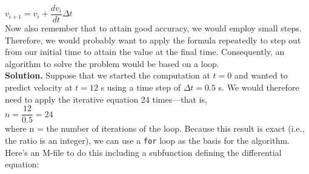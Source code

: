 \documentclass[../main.tex]{subfiles}
\begin{document}
$v_{i+1} = v_i + \dfrac{dv_i}{dt}\Delta t$\\

\noindent Now also remember that to attain good accuracy, we would employ small steps. Therefore,
we would probably want to apply the formula repeatedly to step out from our initial time
to attain the value at the final time. Consequently, an algorithm to solve the problem would
be based on a loop.\\

\noindent\textbf{Solution.} Suppose that we started the computation at $t = 0$ and wanted to predict
velocity at $t = 12$ s using a time step of $\Delta t = 0.5$ s. We would therefore need to apply the
iterative equation 24 times---that is,\\

$n = \dfrac{12}{0.5} = 24$\\

\noindent
where n = the number of iterations of the loop. Because this result is exact (i.e., the ratio is
an integer), we can use a \texttt{for} loop as the basis for the algorithm. Here's an M-file to do this
including a subfunction defining the differential equation:\\
\end{document}
